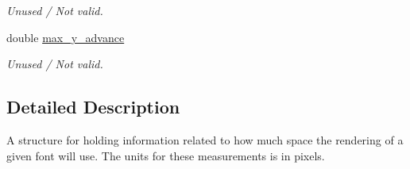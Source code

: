 \begin{DoxyCompactItemize}
\begin{DoxyCompactList}\small\item\em Unused / Not valid. \item\end{DoxyCompactList}\item 
\hypertarget{structt__jgraphics__font__extents_af5b564ef94902b92e3df4265a6e3d13a}{
double \hyperlink{structt__jgraphics__font__extents_af5b564ef94902b92e3df4265a6e3d13a}{max\_\-y\_\-advance}}
\label{structt__jgraphics__font__extents_af5b564ef94902b92e3df4265a6e3d13a}

\begin{DoxyCompactList}\small\item\em Unused / Not valid. \item\end{DoxyCompactList}\end{DoxyCompactItemize}


\subsection{Detailed Description}
A structure for holding information related to how much space the rendering of a given font will use. The units for these measurements is in pixels. 